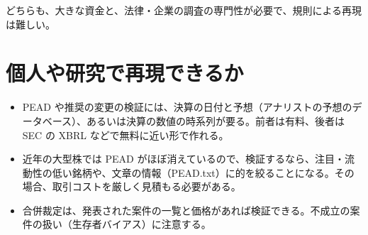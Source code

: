 どちらも、大きな資金と、法律・企業の調査の専門性が必要で、規則による再現は難しい。

\section{個人や研究で再現できるか}

\begin{itemize}
\item PEAD や推奨の変更の検証には、決算の日付と予想（アナリストの予想のデータベース）、あるいは決算の数値の時系列が要る。前者は有料、後者は SEC の XBRL などで無料に近い形で作れる。
\item 近年の大型株では PEAD がほぼ消えているので、検証するなら、注目・流動性の低い銘柄や、文章の情報（PEAD.txt）に的を絞ることになる。その場合、取引コストを厳しく見積もる必要がある。
\item 合併裁定は、発表された案件の一覧と価格があれば検証できる。不成立の案件の扱い（生存者バイアス）に注意する。
\end{itemize}
